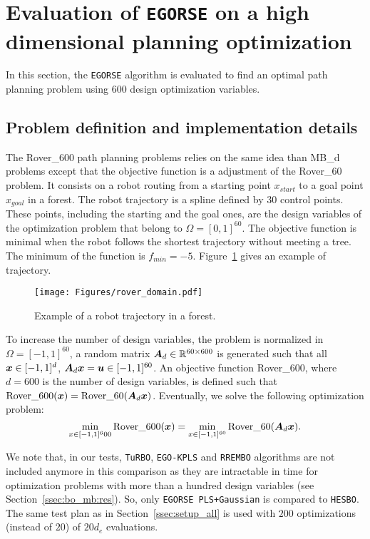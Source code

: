 \section{Evaluation of \texttt{EGORSE} on a high dimensional planning optimization}
\label{sec:rover}

In this section, the \texttt{EGORSE} algorithm is evaluated to find an optimal path planning problem using 600 design optimization variables. 
\subsection{Problem definition and implementation details}

The Rover\_600 path planning problems relies on the same idea than MB\_d problems except that the objective function is a adjustment of the Rover\_60~\cite{WangBatchedHighdimensionalBayesian2018} problem.
It consists on a robot routing from a starting point $x_{start}$ to a goal point $x_{goal}$ in a forest. 
The robot trajectory is a spline defined by 30 control points. 
These points, including the starting and the goal ones, are the design variables of the optimization problem that belong to $\Omega=[0,1]^{60}$.
The objective function is minimal when the robot follows the shortest trajectory without meeting a tree.
The minimum of the function is $f_{min} = -5$.
Figure~\ref{fig:rover_dom} gives an example of trajectory.
\begin{figure}[!htp]
    \centering
    \texttt{[image: Figures/rover\_domain.pdf]}
    \caption{Example of a robot trajectory in a forest.}
    \label{fig:rover_dom}
\end{figure}

To increase the number of design variables, the problem is normalized in $\Omega=[-1,1]^{60}$, a random matrix $\bm{A}_d \in \mathbb{R}^{60  \times 600}$ is generated such that all $\bm{x} \in [-1,1]^d$, $\bm{A}_d \bm{x} = \bm{u} \in [-1,1]^{60}$.
An objective function Rover\_600, where $d=600$ is the number of design variables, is defined such that $\text{Rover\_600}(\bm{x}) = \text{Rover\_60}(\bm{A}_d\bm{x})$.
Eventually, we solve the following optimization problem:
\begin{equation}
    \min\limits_{x \in [-1,1]^600} \text{Rover\_600}(\bm{x}) = \min\limits_{x \in [-1,1]^{60}} \text{Rover\_60}(\bm{A}_d\bm{x}).
\end{equation}

We note that, in our tests, \texttt{TuRBO},  \texttt{EGO-KPLS} and  \texttt{RREMBO} algorithms are not included anymore in this comparison as they are intractable in time for optimization problems with more than a hundred design variables (see Section~\ref{ssec:bo_mb:res}). So, only \texttt{EGORSE PLS+Gaussian} is compared to \texttt{HESBO}. The same test plan as in Section~\ref{ssec:setup_all} is used with $200$ optimizations (instead of $20$) of $20d_e$ evaluations.

